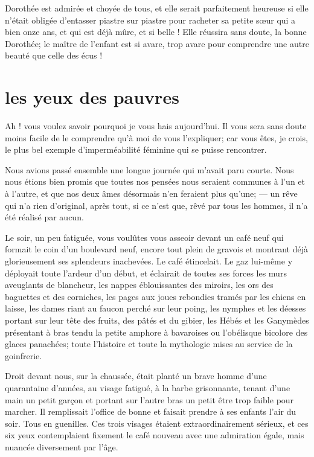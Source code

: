 Dorothée est admirée et choyée de tous, et elle serait parfaitement
heureuse si elle n’était obligée
d’entasser piastre sur piastre pour racheter sa petite
s\oe ur qui a bien onze ans, et qui est déjà mûre, et si belle ! Elle
réussira sans doute, la bonne Dorothée; le maître de
l’enfant est si avare, trop avare pour comprendre une
autre beauté que celle des écus !

\quebra\section[Les yeux des pauvres]{les yeux des pauvres }

Ah ! vous voulez savoir pourquoi je vous hais
aujourd’hui. Il vous sera sans doute moins facile de
le comprendre qu’à moi de vous
l’expliquer; car vous êtes, je crois, le plus bel
exemple d’imperméabilité féminine qui se puisse
rencontrer.

Nous avions passé ensemble une longue journée qui
m’avait paru courte. Nous nous étions bien promis que
toutes nos pensées nous seraient communes à l’un et à
l’autre, et que nos deux âmes désormais
n’en feraient plus qu’une; --- un rêve
qui n’a rien d’original, après tout,
si ce n’est que, rêvé par tous les hommes, il
n’a été réalisé par aucun.

Le soir, un peu fatiguée, vous voulûtes vous asseoir devant un café neuf
qui formait le coin d’un boulevard neuf, encore tout
plein de gravois et montrant déjà glorieusement ses splendeurs
inachevées. Le café étincelait. Le gaz lui{}-même y déployait toute
l’ardeur d’un début, et éclairait de
toutes ses forces les murs aveuglants de blancheur, les nappes
éblouissantes des miroirs, les ors des baguettes et des corniches, les
pages aux joues rebondies tramés par les chiens en laisse, les dames
riant au faucon perché sur leur poing, les nymphes et les déesses
portant sur leur tête des fruits, des pâtés et du gibier, les Hébés et
les Ganymèdes présentant à bras tendu la petite amphore à bavaroises ou
l’obélisque bicolore des glaces panachées; toute
l’histoire et toute la mythologie mises au service de
la goinfrerie.

Droit devant nous, sur la chaussée, était planté un brave homme
d’une quarantaine d’années, au visage
fatigué, à la barbe grisonnante, tenant d’une main un
petit garçon et portant sur l’autre bras un petit être
trop faible pour marcher. Il remplissait l’office de
bonne et faisait prendre à ses enfants l’air du soir.
Tous en guenilles. Ces trois visages étaient extraordinairement
sérieux, et ces six yeux contemplaient fixement le café nouveau avec
une admiration égale, mais nuancée diversement par
l’âge.

